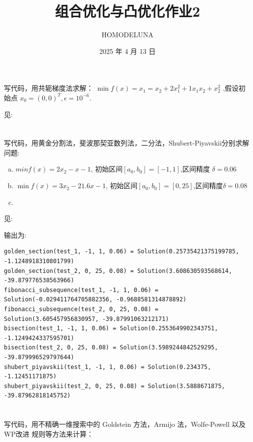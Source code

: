 \documentclass[a4paper]{article}
\title{组合优化与凸优化作业2}
\author{HOMODELUNA}
\date{2025 年 4 月 13 日}
\begin{document}
\maketitle
\section{}

写代码，用共轭梯度法求解： \(\min f(x) = x_1 = x_2 + 2x_1^2 + 1x_1x_2 + x_2^2\)
,假设初始点 $x_0 = (0,0)^T, \epsilon = 10^{-6}$.

见: 

\section{}

写代码，用黄金分割法，斐波那契亚数列法，二分法，Shubert-Piyavskii分别求解问题:

\begin{enumerate}[(a)]
    \item \(min f(x) = 2x_2 -x -1\), 初始区间\( [a_0,b_0] = [-1,1]\),区间精度 \(\delta = 0.06\)
    
    \item \(\min f(x)=3x_2 - 21.6x-1\), 初始区间\([a_0,b_0] = [0,25]\),区间精度\(\delta = 0.08\)
    \item 
\end{enumerate}

见:

输出为:
\begin{lstlisting}
golden_section(test_1, -1, 1, 0.06) = Solution(0.25735421375199785, -1.1248918310801799)
golden_section(test_2, 0, 25, 0.08) = Solution(3.608630593568614, -39.879776538563966)
fibonacci_subsequence(test_1, -1, 1, 0.06) = Solution(-0.029411764705882356, -0.9688581314878892)
fibonacci_subsequence(test_2, 0, 25, 0.08) = Solution(3.605457956830957, -39.87991063212171)
bisection(test_1, -1, 1, 0.06) = Solution(0.2553649902343751, -1.1249424337595701)
bisection(test_2, 0, 25, 0.08) = Solution(3.5989244842529295, -39.879996529797644)
shubert_piyavskii(test_1, -1, 1, 0.06) = Solution(0.234375, -1.12451171875)
shubert_piyavskii(test_2, 0, 25, 0.08) = Solution(3.5888671875, -39.87962818145752)
\end{lstlisting}

\section{}
写代码，用不精确一维搜索中的 Goldstein 方法，Armijo 法，Wolfe-Powell 以及WP改进
规则等方法来计算：
\end{document}
